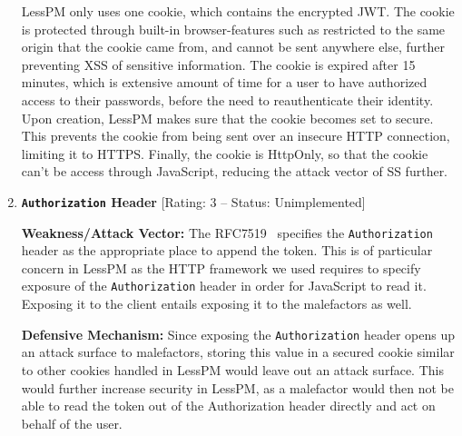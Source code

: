 \begin{enumerate}[label=$\blacktriangleright$]
  LessPM only uses one cookie, which contains the encrypted JWT\@.
  The cookie is protected through built-in browser-features such as
  restricted to the same origin that the cookie came from, and cannot be sent
  anywhere else, further preventing XSS of sensitive information\@.
  The cookie is expired after 15 minutes, which is extensive amount of time
  for a user to have authorized access to their passwords, before the need to
  reauthenticate their identity.
  Upon creation, LessPM makes sure that the cookie becomes set to secure.
  This prevents the cookie from being sent over an insecure HTTP connection,
  limiting it to HTTPS\@.
  Finally, the cookie is HttpOnly, so that the cookie can't be access through
  JavaScript, reducing the attack vector of SS further.

  \item \textbf{\texttt{Authorization} Header}
  [Rating: 3 -- Status: Unimplemented]
  
  \textbf{Weakness/Attack Vector:}
  The RFC7519~\cite{RFC7519} specifies the \texttt{Authorization} header as
  the appropriate place to append the token.
  This is of particular concern in LessPM as the HTTP framework we used requires
  to specify exposure of the \texttt{Authorization} header in order for
  JavaScript to read it.
  Exposing it to the client entails exposing it to the malefactors as well.

  \textbf{Defensive Mechanism:}
  Since exposing the \texttt{Authorization} header opens up an attack surface
  to malefactors, storing this value in a secured cookie similar to other
  cookies handled in LessPM would leave out an attack surface.
  This would further increase security in LessPM, as a malefactor would then
  not be able to read the token out of the Authorization header directly and
  act on behalf of the user.

\end{enumerate}